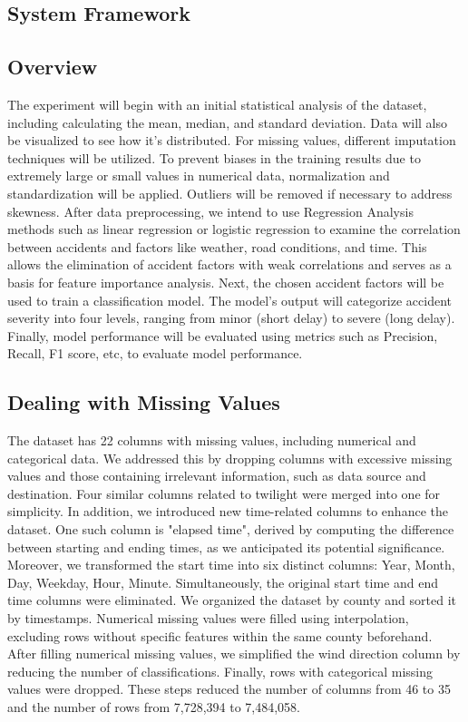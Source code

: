 \documentclass[10pt,twocolumn,letterpaper]{article}
\begin{document}
\begin{CJK}{UTF8}{bsmi}

\section{System Framework}
\label{sec:formatting}


\subsection{Overview}
The experiment will begin with an initial statistical analysis of the dataset, including calculating the mean, median, and standard deviation. Data will also be visualized to see how it's distributed. For missing values, different imputation techniques will be utilized. To prevent biases in the training results due to extremely large or small values in numerical data, normalization and standardization will be applied. Outliers will be removed if necessary to address skewness. After data preprocessing, we intend to use Regression Analysis methods such as linear regression or logistic regression to examine the correlation between accidents and factors like weather, road conditions, and time. This allows the elimination of accident factors with weak correlations and serves as a basis for feature importance analysis. Next, the chosen accident factors will be used to train a classification model. The model’s output will categorize accident severity into four levels, ranging from minor (short delay) to severe (long delay). Finally, model performance will be evaluated using metrics such as Precision, Recall, F1 score, etc, to evaluate model performance.

\subsection{Dealing with Missing Values}
The dataset has 22 columns with missing values, including numerical and categorical data. We addressed this by dropping columns with excessive missing values and those containing irrelevant information, such as data source and destination. Four similar columns related to twilight were merged into one for simplicity. In addition, we introduced new time-related columns to enhance the dataset. One such column is "elapsed time", derived by computing the difference between starting and ending times, as we anticipated its potential significance. Moreover, we transformed the start time into six distinct columns: Year, Month, Day, Weekday, Hour, Minute. Simultaneously, the original start time and end time columns were eliminated. We organized the dataset by county and sorted it by timestamps. Numerical missing values were filled using interpolation, excluding rows without specific features within the same county beforehand. After filling numerical missing values, we simplified the wind direction column by reducing the number of classifications. Finally, rows with categorical missing values were dropped. These steps reduced the number of columns from 46 to 35 and the number of rows from 7,728,394 to 7,484,058.


\end{CJK}
\end{document}
